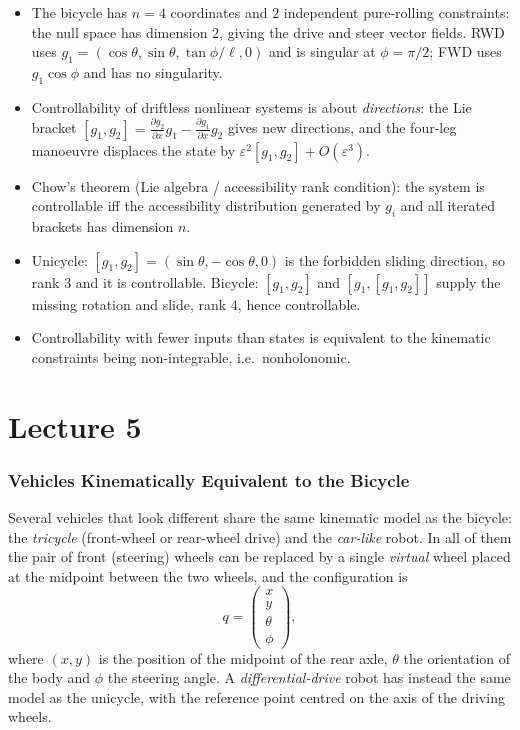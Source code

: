 \documentclass[11pt,a4paper]{article}
\def\bm#1{#1}%
\newcommand{\LB}[2]{[#1,#2]}
\newcommand{\qv}{\bm{q}}
\theoremstyle{definition}
\theoremstyle{plain}
\theoremstyle{remark}
\begin{document}
\begin{itemize}
\item The bicycle has $n=4$ coordinates and $2$ independent pure-rolling constraints: the null space has dimension $2$, giving the drive and steer vector fields. RWD uses $g_1=(\cos\theta,\sin\theta,\tan\phi/\ell,0)$ and is singular at $\phi=\pi/2$; FWD uses $g_1\cos\phi$ and has no singularity.
\item Controllability of driftless nonlinear systems is about \emph{directions}: the Lie bracket $\LB{g_1}{g_2}=\frac{\partial g_2}{\partial x}g_1-\frac{\partial g_1}{\partial x}g_2$ gives new directions, and the four-leg manoeuvre displaces the state by $\varepsilon^2\LB{g_1}{g_2}+O(\varepsilon^3)$.
\item Chow's theorem (Lie algebra / accessibility rank condition): the system is controllable iff the accessibility distribution generated by $g_i$ and all iterated brackets has dimension $n$.
\item Unicycle: $\LB{g_1}{g_2}=(\sin\theta,-\cos\theta,0)$ is the forbidden sliding direction, so rank $3$ and it is controllable. Bicycle: $\LB{g_1}{g_2}$ and $\LB{g_1}{\LB{g_1}{g_2}}$ supply the missing rotation and slide, rank $4$, hence controllable.
\item Controllability with fewer inputs than states is equivalent to the kinematic constraints being non-integrable, i.e.\ nonholonomic.
\end{itemize}

\newpage

\setcounter{section}{0}
\renewcommand{\thesection}{\arabic{section}}
\part{Lecture 5}

\section{Vehicles Kinematically Equivalent to the Bicycle}

Several vehicles that look different share the same kinematic model as the bicycle:
the \emph{tricycle} (front-wheel or rear-wheel drive) and the \emph{car-like} robot.
In all of them the pair of front (steering) wheels can be replaced by a single
\emph{virtual} wheel placed at the midpoint between the two wheels, and the configuration is
\[
  \qv=\begin{pmatrix}x\\y\\\theta\\\phi\end{pmatrix},
\]
where $(x,y)$ is the position of the midpoint of the rear axle, $\theta$ the orientation of the body and $\phi$ the steering angle.
A \emph{differential-drive} robot has instead the same model as the unicycle, with the reference point centred on the axis of the driving wheels.
\end{document}
